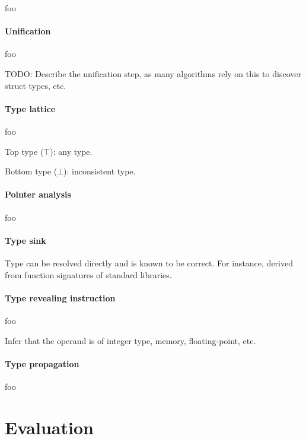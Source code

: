 \documentclass[10pt, a4paper, sigplan, authordraft]{acmart}
\begin{document}
foo

\paragraph{Unification}

foo

TODO: Describe the unification step, as many algorithms rely on this to discover struct types, etc.

\paragraph{Type lattice}

foo

Top type ($\top$): any type.

Bottom type ($\bot$): inconsistent type.

\paragraph{Pointer analysis}

foo

\paragraph{Type sink}


Type can be resolved directly and is known to be correct. For instance, derived from function signatures of standard libraries.

\paragraph{Type revealing instruction}

foo


Infer that the operand is of integer type, memory, floating-point, etc.


\paragraph{Type propagation}

foo


\section{Evaluation}
\end{document}
